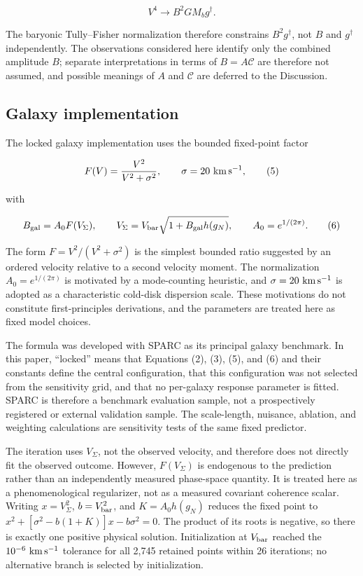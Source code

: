 \documentclass[utf8]{FrontiersinHarvard}
\begin{document}
\[
V^4\rightarrow B^2GM_b g^\dagger .
\tag{4}
\]

The baryonic Tully--Fisher normalization therefore constrains \(B^2g^\dagger\), not \(B\) and \(g^\dagger\) independently. The observations considered here identify only the combined amplitude \(B\); separate interpretations in terms of \(B=A\mathcal C\) are therefore not assumed, and possible meanings of \(A\) and \(\mathcal C\) are deferred to the Discussion.

\subsection{Galaxy implementation}\label{galaxy-implementation}

The locked galaxy implementation uses the bounded fixed-point factor

\[
F(V)=\frac{V^2}{V^2+\sigma^2},
\qquad \sigma=20\ {\rm km\,s^{-1}},
\tag{5}
\]

with

\[
B_{\rm gal}=A_0F(V_\Sigma),\qquad
V_\Sigma=V_{\rm bar}\sqrt{1+B_{\rm gal}h(g_N)},\qquad
A_0=e^{1/(2\pi)} .
\tag{6}
\]

The form \(F=V^2/(V^2+\sigma^2)\) is the simplest bounded ratio suggested by an ordered velocity relative to a second velocity moment. The normalization \(A_0=e^{1/(2\pi)}\) is motivated by a mode-counting heuristic, and \(\sigma=20\ {\rm km\,s^{-1}}\) is adopted as a characteristic cold-disk dispersion scale. These motivations do not constitute first-principles derivations, and the parameters are treated here as fixed model choices.

The formula was developed with SPARC as its principal galaxy benchmark. In this paper, ``locked'' means that Equations (2), (3), (5), and (6) and their constants define the central configuration, that this configuration was not selected from the sensitivity grid, and that no per-galaxy response parameter is fitted. SPARC is therefore a benchmark evaluation sample, not a prospectively registered or external validation sample. The scale-length, nuisance, ablation, and weighting calculations are sensitivity tests of the same fixed predictor.

The iteration uses \(V_\Sigma\), not the observed velocity, and therefore does not directly fit the observed outcome. However, \(F(V_\Sigma)\) is endogenous to the prediction rather than an independently measured phase-space quantity. It is treated here as a phenomenological regularizer, not as a measured covariant coherence scalar. Writing \(x=V_\Sigma^2\), \(b=V_{\rm bar}^2\), and \(K=A_0h(g_N)\) reduces the fixed point to \(x^2+[\sigma^2-b(1+K)]x-b\sigma^2=0\). The product of its roots is negative, so there is exactly one positive physical solution. Initialization at \(V_{\rm bar}\) reached the \(10^{-6}\ {\rm km\,s^{-1}}\) tolerance for all 2,745 retained points within 26 iterations; no alternative branch is selected by initialization.
\end{document}
